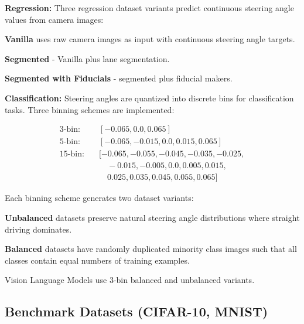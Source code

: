 
\textbf{Regression:} Three regression dataset variants predict continuous steering angle values from camera images:

\textbf{Vanilla} uses raw camera images as input with continuous steering angle targets.

\textbf{Segmented} - Vanilla plus lane segmentation.

\textbf{Segmented with Fiducials} - segmented plus fiducial makers.


\textbf{Classification:} Steering angles are quantized into discrete bins for classification tasks. Three binning schemes are implemented:

\begin{align*}
\text{3-bin:} &\quad [-0.065, 0.0, 0.065] \\
\text{5-bin:} &\quad [-0.065, -0.015, 0.0, 0.015, 0.065] \\
\text{15-bin:} &\quad [-0.065, -0.055, -0.045, -0.035, -0.025, \\
&\quad\quad -0.015, -0.005, 0.0, 0.005, 0.015, \\
&\quad\quad 0.025, 0.035, 0.045, 0.055, 0.065]
\end{align*}

Each binning scheme generates two dataset variants:

\textbf{Unbalanced} datasets preserve natural steering angle distributions where straight driving dominates.

\textbf{Balanced} datasets have randomly duplicated minority class images such that all classes contain equal numbers of training examples.

Vision Language Models use 3-bin balanced and unbalanced variants.


\subsection{Benchmark Datasets (CIFAR-10, MNIST)}

